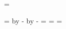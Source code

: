 

\newdimen\pagewidth \pagewidth=30pc
\newdimen\pageheight \pageheight=48pc
\newdimen\margintop \margintop=4.5pc
\newdimen\marginbot \marginbot=\margintop
\newdimen\margininner \margininner=5pc
\newdimen\marginouter \marginouter=3pc

\hsize=\pagewidth
\advance\hsize by -\margininner
\advance\hsize by -\margininner
\voffset=\margintop
\hoffset=\margininner
\vsize=\pagewidth
